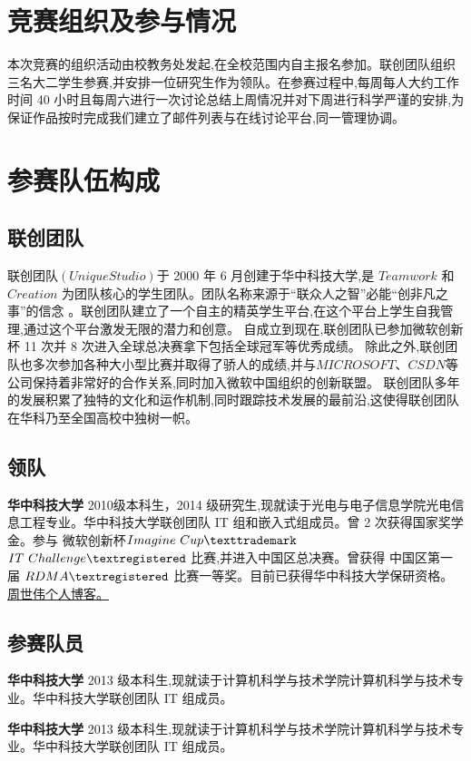 \documentclass[format=draft,language=chinese,category=SDN]{hustreport}
\begin{document}
\section{竞赛组织及参与情况}
本次竞赛的组织活动由校教务处发起,在全校范围内自主报名参加。联创团队组织三名大二学生参赛,并安排一位研究生作为领队。在参赛过程中,每周每人大约工作时间 40 小时且每周六进行一次讨论总结上周情况并对下周进行科学严谨的安排,为保证作品按时完成我们建立了邮件列表与在线讨论平台,同一管理协调。
\section{参赛队伍构成}
\subsection{联创团队}
联创团队$(Unique Studio)$于 2000 年 6 月创建于华中科技大学,是 $Teamwork$ 和
 $Creation$ 为团队核心的学生团队。团队名称来源于“联众人之智”必能“创非凡之事”的信念
。联创团队建立了一个自主的精英学生平台,在这个平台上学生自我管理,通过这个平台激发无限的潜力和创意。
自成立到现在,联创团队已参加微软创新杯 11 次并 8 次进入全球总决赛拿下包括全球冠军等优秀成绩。
除此之外,联创团队也多次参加各种大小型比赛并取得了骄人的成绩,并与$MICROSOFT$\texttrademark、$CSDN$\texttrademark 等公司保持着非常好的合作关系,同时加入微软中国组织的创新联盟。
联创团队多年的发展积累了独特的文化和运作机制,同时跟踪技术发展的最前沿,这使得联创团队在华科乃至全国高校中独树一帜。
\subsection{领队}

\textbf{华中科技大学} 2010级本科生，2014 级研究生,现就读于光电与电子信息学院光电信息工程专业。华中科技大学联创团队 IT 组和嵌入式组成员。曾 2 次获得国家奖学金。参与 微软创新杯$Imagine~Cup\texttrademark$ $IT~Challenge\textregistered$ 比赛,并进入中国区总决赛。曾获得
中国区第一届 $RDMA\textregistered$ 比赛一等奖。目前已获得华中科技大学保研资格。
\href{http://zhoushiwei1992.blog.163.com}{周世伟个人博客。}
\subsection{参赛队员}

\textbf{华中科技大学} 2013 级本科生,现就读于计算机科学与技术学院计算机科学与技术专业。华中科技大学联创团队 IT 组成员。


\textbf{华中科技大学} 2013 级本科生,现就读于计算机科学与技术学院计算机科学与技术专业。华中科技大学联创团队 IT 组成员。
\end{document}
